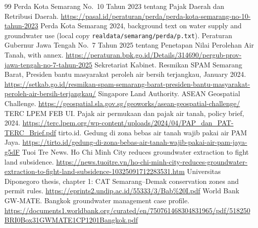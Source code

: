 \begin{thebibliography}{99}
 Perda Kota Semarang No.\ 10 Tahun 2023 tentang Pajak Daerah dan Retribusi Daerah. \url{https://pasal.id/peraturan/perda/perda-kota-semarang-no-10-tahun-2023}
 Perda Kota Semarang 2024, background text on water supply and groundwater use (local copy \texttt{realdata/semarang/perda/p.txt}).
 Peraturan Gubernur Jawa Tengah No.\ 7 Tahun 2025 tentang Penetapan Nilai Perolehan Air Tanah, with annex. \url{https://peraturan.bpk.go.id/Details/314690/pergub-prov-jawa-tengah-no-7-tahun-2025}
 Sekretariat Kabinet. Resmikan SPAM Semarang Barat, Presiden bantu masyarakat peroleh air bersih terjangkau, January 2024. \url{https://setkab.go.id/resmikan-spam-semarang-barat-presiden-bantu-masyarakat-peroleh-air-bersih-terjangkau/}
 Singapore Land Authority. ASEAN Geospatial Challenge. \url{https://geospatial.sla.gov.sg/geoworks/asean-geospatial-challenge/}
 TERC LPEM FEB UI. Pajak air permukaan dan pajak air tanah, policy brief, 2024. \url{https://terc.lpem.org/wp-content/uploads/2024/04/PAP_dan_PAT-TERC_Brief.pdf}
 tirto.id. Gedung di zona bebas air tanah wajib pakai air PAM Jaya. \url{https://tirto.id/gedung-di-zona-bebas-air-tanah-wajib-pakai-air-pam-jaya-g5dF}
 Tuoi Tre News. Ho Chi Minh City reduces groundwater extraction to fight land subsidence. \url{https://news.tuoitre.vn/ho-chi-minh-city-reduces-groundwater-extraction-to-fight-land-subsidence-10325091712283531.htm}
 Universitas Diponegoro thesis, chapter 1: CAT Semarang--Demak conservation zones and permit rules. \url{https://eprints2.undip.ac.id/55333/3/Bab%20I.pdf}
 World Bank GW-MATE. Bangkok groundwater management case profile. \url{https://documents1.worldbank.org/curated/en/750761468304831965/pdf/518250BRI0Box31GWMATE1CP1201Bangkok.pdf}
\end{thebibliography}
